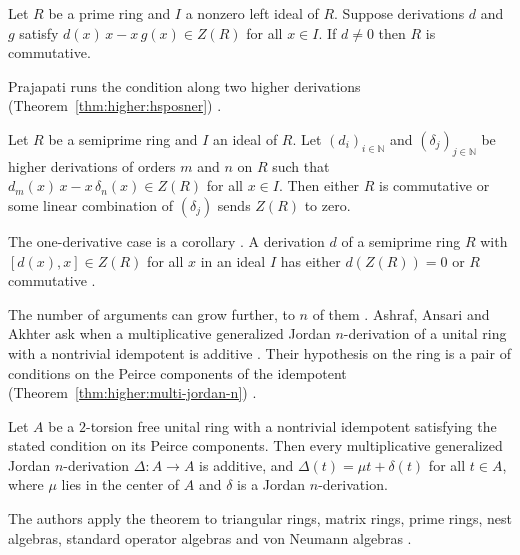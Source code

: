 \begin{theorem}\label{thm:higher:bresarB-brief}
Let $R$ be a prime ring and $I$ a nonzero left ideal of $R$. Suppose
derivations $d$ and $g$ satisfy $d(x)\,x-x\,g(x)\in Z(R)$ for all $x\in I$.
If $d\neq 0$ then $R$ is commutative.
\end{theorem}

Prajapati runs the condition along two higher derivations (Theorem~\ref{thm:higher:hsposner})
\cite[p.~9]{Prajapati2021}.\begin{theorem}\label{thm:higher:hsposner}
Let $R$ be a semiprime ring and $I$ an ideal of $R$. Let $(d_i)_{i\in
\mathbb{N}}$ and $(\delta_j)_{j\in\mathbb{N}}$ be higher derivations of
orders $m$ and $n$ on $R$ such that $d_m(x)\,x-x\,\delta_n(x)\in Z(R)$ for
all $x\in I$. Then either $R$ is commutative or some linear combination of
$(\delta_j)$ sends $Z(R)$ to zero.
\end{theorem}

The one-derivative case is a corollary
\cite[p.~9]{Prajapati2021}. A derivation $d$ of a semiprime ring $R$ with
$[d(x),x]\in Z(R)$ for all $x$ in an ideal $I$ has either $d(Z(R))=0$ or
$R$ commutative \cite[p.~9]{Prajapati2021}.

The number of arguments can grow further, to $n$ of them
\cite[p.~1]{AshrafAnsariAkhter2022}. Ashraf, Ansari and Akhter ask when a
multiplicative generalized Jordan $n$-derivation of a unital ring with a nontrivial
idempotent is additive \cite[p.~1]{AshrafAnsariAkhter2022}. Their hypothesis on the
ring is a pair of conditions on the Peirce components of the idempotent (Theorem~\ref{thm:higher:multi-jordan-n})
\cite[p.~3]{AshrafAnsariAkhter2022}.\begin{theorem}\label{thm:higher:multi-jordan-n}
Let $A$ be a $2$-torsion free unital ring with a nontrivial idempotent satisfying
the stated condition on its Peirce components. Then every multiplicative
generalized Jordan $n$-derivation $\Delta\colon A\to A$ is additive, and
$\Delta(t)=\mu t+\delta(t)$ for all $t\in A$, where $\mu$ lies in the center of $A$
and $\delta$ is a Jordan $n$-derivation.
\end{theorem}

The authors apply the theorem to triangular rings, matrix rings, prime rings, nest
algebras, standard operator algebras and von Neumann algebras
\cite[p.~1]{AshrafAnsariAkhter2022}.

